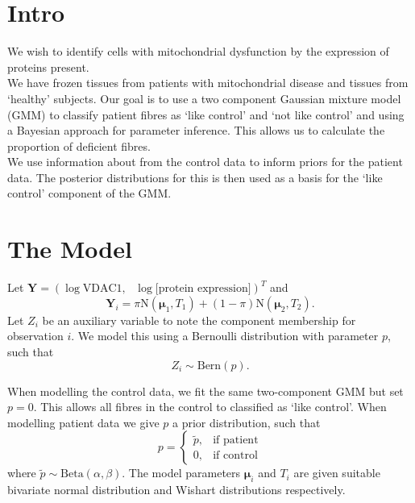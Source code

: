 \documentclass[a4paper, 12pt]{article}
\begin{document}
\section*{Intro}

We wish to identify cells with mitochondrial dysfunction by the expression of proteins present. \\
We have frozen tissues from patients with mitochondrial disease and tissues from `healthy' subjects. Our goal is to use a two component Gaussian mixture model (GMM) to classify patient fibres as `like control' and `not like control' and using a Bayesian approach for parameter inference. This allows us to calculate the proportion of deficient fibres. \\

We use information about from the control data to inform priors for the patient data. The posterior distributions for this is then used as a basis for the `like control' component of the GMM. 

\section*{The Model}
Let $\boldsymbol{Y}=\left( \log\text{VDAC1},\text{  } \log\text{[protein expression]}  \right)^T$ and 
\begin{equation}
    \boldsymbol{Y}_i = \pi \text{N}\left( \boldsymbol{\mu}_1, T_1 \right) + (1-\pi)\text{N}(\boldsymbol{\mu}_2, T_2).
\end{equation}
Let $Z_i$ be an auxiliary variable to note the component membership for observation $i$. We model this using a Bernoulli distribution with parameter $p$, such that
\begin{equation}
    Z_i \sim \text{Bern}(p).
\end{equation}

When modelling the control data, we fit the same two-component GMM but set $p=0$. This allows all fibres in the control to classified as `like control'. When modelling patient data we give $p$ a prior distribution, such that
\begin{equation}
    p = \begin{cases}
        \tilde{p}, & \text{if patient} \\
        0, & \text{if control}
    \end{cases}
\end{equation}
where $\tilde{p}\sim \text{Beta}(\alpha, \beta)$. The model parameters $\boldsymbol{\mu}_i$ and $T_i$ are given suitable bivariate normal distribution and Wishart distributions respectively.
\end{document}
